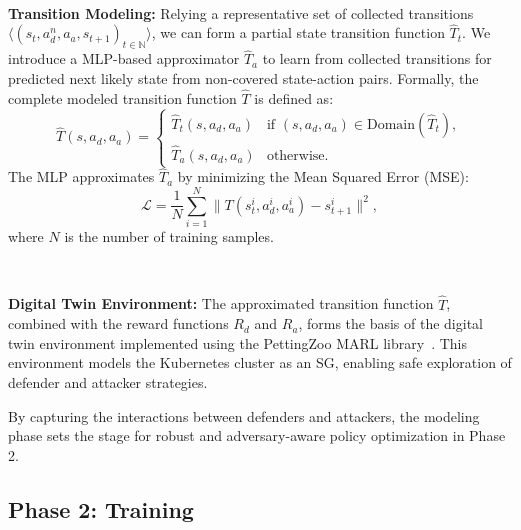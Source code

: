 \documentclass[conference]{IEEEtran}
\begin{document}
\

\noindent \textbf{Transition Modeling:} Relying a representative set of collected transitions $\langle(s_t, a_d^n, a_a, s_{t+1})_{t\in \mathbb{N}}\rangle$, we can form a partial state transition function $\hat{T}_t$. We introduce a MLP-based approximator $\hat{T}_a$ to learn from collected transitions for predicted next likely state from non-covered state-action pairs. Formally, the complete modeled transition function $\hat{T}$ is defined as:
$$
\hat{T}(s, a_d, a_a) = 
\begin{cases} 
\hat{T}_t(s, a_d, a_a) & \text{if } (s, a_d, a_a) \in \text{Domain}(\hat{T}_t), \\
\hat{T}_a(s, a_d, a_a) & \text{otherwise}.
\end{cases}
$$
The MLP approximates $\hat{T}_a$ by minimizing the Mean Squared Error (MSE):
$$
\mathcal{L} = \frac{1}{N} \sum_{i=1}^N \|T(s_t^i, a_d^i, a_a^i) - s_{t+1}^i\|^2,
$$
where $N$ is the number of training samples.

\

\noindent \textbf{Digital Twin Environment:} The approximated transition function $\hat{T}$, combined with the reward functions $R_d$ and $R_a$, forms the basis of the digital twin environment implemented using the PettingZoo MARL library~\cite{Terry2021}. This environment models the Kubernetes cluster as an SG, enabling safe exploration of defender and attacker strategies.

By capturing the interactions between defenders and attackers, the modeling phase sets the stage for robust and adversary-aware policy optimization in Phase 2.


\subsection{Phase 2: Training}
\end{document}
